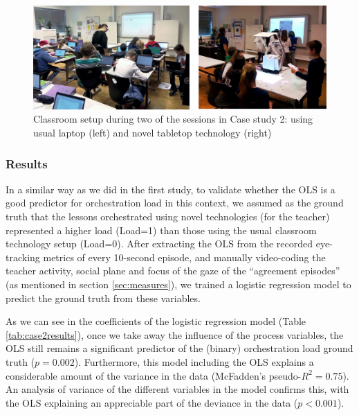 \documentclass[10pt,journal,compsoc]{IEEEtran}
\begin{document}
\begin{figure}[!t]
\centering
\includegraphics[width=\linewidth]{img/Case2Picture}
\caption{Classroom setup during two of the sessions in Case study 2: using usual laptop (left) and novel tabletop technology (right)}
\label{fig:case2picture}
\end{figure}

\subsubsection{Results}

In a similar way as we did in the first study, to validate whether the OLS is a good predictor for orchestration load in this context, we assumed as the ground truth that the lessons orchestrated using novel technologies (for the teacher) represented a higher load (Load=1) than those using the usual classroom technology setup (Load=0). After extracting the OLS from the recorded eye-tracking metrics of every 10-second episode, and manually video-coding the teacher activity, social plane and focus of the gaze of the ``agreement episodes'' (as mentioned in section \ref{sec:measures}), we trained a logistic regression model to predict the ground truth from these variables.

As we can see in the coefficients of the logistic regression model (Table \ref{tab:case2results}), once we take away the influence of the process variables, the OLS still remains a significant predictor of the (binary) orchestration load ground truth ($p=0.002$). Furthermore, this model including the OLS explains a considerable amount of the variance in the data (McFadden's pseudo-$R^2=0.75$). An analysis of variance of the different variables in the model confirms this, with the OLS explaining an appreciable part of the deviance in the data ($p<0.001$). 
\end{document}
